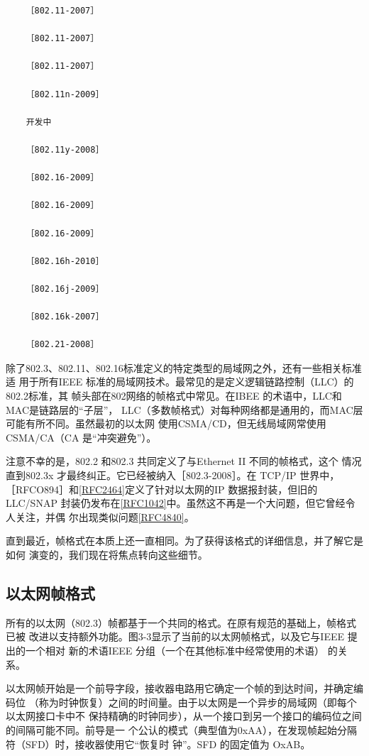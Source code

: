 \begin{verbatim}
    ［802.11-2007］
    
    ［802.11-2007］
    
    ［802.11-2007］
    
    ［802.11n-2009］
    
    开发中
    
    ［802.11y-2008］
    
    ［802.16-2009］
    
    ［802.16-2009］
    
    ［802.16-2009］
    
    ［802.16h-2010］
    
    ［802.16j-2009］
    
    ［802.16k-2007］
    
    ［802.21-2008］
\end{verbatim}

除了802.3、802.11、802.16标准定义的特定类型的局域网之外，还有一些相关标准适
用于所有IEEE 标准的局域网技术。最常见的是定义逻辑链路控制（LLC）的802.2标准，其
帧头部在802网络的帧格式中常见。在IBEE 的术语中，LLC和MAC是链路层的“子层”，
LLC（多数帧格式）对每种网络都是通用的，而MAC层可能有所不同。虽然最初的以太网
使用CSMA/CD，但无线局域网常使用CSMA/CA（CA 是“冲突避免”）。

\begin{tcolorbox}
    注意不幸的是，802.2 和802.3 共同定义了与Ethernet II 不同的帧格式，这个
    情况直到802.3x 才最终纠正。它已经被纳入［802.3-2008］。在 TCP/IP 世界中，
    ［RFCO894］和\href{https://www.rfc-editor.org/rfc/rfc2464}{[RFC2464]}定义了针对以太网的IP 数据报封装，但旧的LLC/SNAP
    封装仍发布在\href{https://www.rfc-editor.org/rfc/rfc1042}{[RFC1042]}中。虽然这不再是一个大问题，但它曾经令人关注，并偶
    尔出现类似问题\href{https://www.rfc-editor.org/rfc/rfc4840}{[RFC4840]}。
\end{tcolorbox}

直到最近，帧格式在本质上还一直相同。为了获得该格式的详细信息，并了解它是如何
演变的，我们现在将焦点转向这些细节。

\subsection{以太网帧格式}

所有的以太网（802.3）帧都基于一个共同的格式。在原有规范的基础上，帧格式已被
改进以支持额外功能。图3-3显示了当前的以太网帧格式，以及它与IEEE 提出的一个相对
新的术语IEEE 分组（一个在其他标准中经常使用的术语） 的关系。

以太网帧开始是一个前导字段，接收器电路用它确定一个帧的到达时间，并确定编码位
（称为时钟恢复）之间的时间量。由于以太网是一个异步的局域网（即每个以太网接口卡中不
保持精确的时钟同步），从一个接口到另一个接口的编码位之间的间隔可能不同。前导是一
个公认的模式（典型值为0xAA），在发现帧起始分隔符（SFD）时，接收器使用它“恢复时
钟”。SFD 的固定值为 OxAB。


